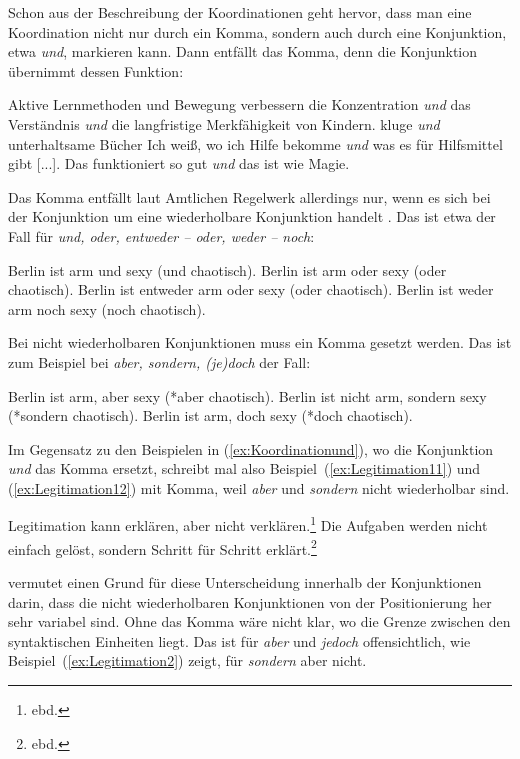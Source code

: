 Schon aus der Beschreibung der Koordinationen geht hervor, dass man eine Koordination nicht nur durch ein Komma, sondern auch durch eine Konjunktion, etwa \textit{und}, markieren kann. Dann entfällt das Komma, denn die Konjunktion übernimmt dessen Funktion:

\ea\label{ex:Koordinationund}
\ea Aktive Lernmethoden und Bewegung verbessern die Konzentration \textit{und} das Verständnis \textit{und} die langfristige Merkfähigkeit von Kindern.
\ex kluge \textit{und} unterhaltsame Bücher
\ex Ich weiß, wo ich Hilfe bekomme \textit{und} was es für Hilfsmittel gibt [...].
\ex Das funktioniert so gut \textit{und} das ist wie Magie.
\z
\z

Das Komma entfällt laut Amtlichen Regelwerk allerdings nur, wenn es sich bei der Konjunktion um eine wiederholbare Konjunktion handelt \citep[74f]{Bredel2020}. Das ist etwa der Fall für \textit{und, oder, entweder -- oder, weder -- noch}:

\ea
\ea Berlin ist arm und sexy (und chaotisch).
\ex Berlin ist arm oder sexy (oder chaotisch).
\ex Berlin ist entweder arm oder sexy (oder chaotisch).
\ex Berlin ist weder arm noch sexy (noch chaotisch).
\z
\z

Bei nicht wiederholbaren Konjunktionen muss ein Komma gesetzt werden. Das ist zum Beispiel bei \textit{aber, sondern, (je)doch} der Fall:


\ea
\ea Berlin ist arm, aber sexy (*aber chaotisch).
\ex Berlin ist nicht arm, sondern sexy (*sondern chaotisch).
\ex Berlin ist arm, doch  sexy (*doch chaotisch).
\z
\z

Im Gegensatz zu den Beispielen in (\ref{ex:Koordinationund}), wo die Konjunktion \textit{und} das Komma ersetzt, schreibt mal also Beispiel~(\ref{ex:Legitimation11}) und (\ref{ex:Legitimation12}) mit Komma, weil \textit{aber} und \textit{sondern} nicht wiederholbar sind.

\ea\label{ex:Legitimation1}
\ea Legitimation kann erklären, aber nicht verklären.\footnote{ebd.}\label{ex:Legitimation11}
\ex Die Aufgaben werden nicht einfach gelöst, sondern Schritt für Schritt erklärt.\footnote{ebd.}\label{ex:Legitimation12}
\z
\z

\citet[74]{Bredel2020} vermutet einen Grund für diese Unterscheidung innerhalb der Konjunktionen darin, dass die nicht wiederholbaren Konjunktionen von der Positionierung her sehr variabel sind. Ohne das Komma wäre nicht klar, wo die Grenze zwischen den syntaktischen Einheiten liegt. Das ist für \textit{aber} und \textit{jedoch} offensichtlich, wie Beispiel~(\ref{ex:Legitimation2}) zeigt, für \textit{sondern} aber nicht.

